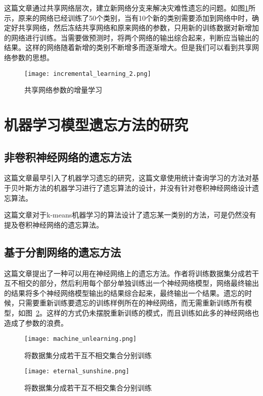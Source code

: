这篇文章\cite{Sarwar_2020}通过共享网络层次，建立新网络分支来解决灾难性遗忘的问题。如图\ref{fig:incremental_learning_2}所示，原来的网络已经训练了50个类别，当有10个新的类别需要添加到网络中时，确定好共享网络，然后冻结共享网络和原来网络的参数，只用新的训练数据对新增加的网络进行训练。当需要做预测时，将两个网络的输出综合起来，判断应当输出的结果。这样的网络随着新增的类别不断增多而逐渐增大。但是我们可以看到共享网络参数的思想。
\begin{figure}
    \centering
    \texttt{[image: incremental\_learning\_2.png]}
    \caption{共享网络参数的增量学习}
    \label{fig:incremental_learning_2}
\end{figure}

\section{机器学习模型遗忘方法的研究}
\subsection{非卷积神经网络的遗忘方法}
这篇文章\cite{yinzhicao2015}最早引入了机器学习遗忘的研究，这篇文章使用统计查询学习的方法对基于贝叶斯方法的机器学习进行了遗忘算法的设计，并没有针对卷积神经网络设计遗忘算法。

这篇文章\cite{antonio2019}对于k-means机器学习的算法设计了遗忘某一类别的方法，可是仍然没有提及卷积神经网络的遗忘算法。

\subsection{基于分割网络的遗忘方法}
这篇文章\cite{2019arXiv191203817B}提出了一种可以用在神经网络上的遗忘方法。作者将训练数据集分成若干互不相交的部分，然后利用每个部分单独训练出一个神经网络模型，网络最终输出的结果将多个神经网络模型输出的结果综合起来，最终输出一个结果。遗忘的时候，只需要重新训练要遗忘的训练样例所在的神经网络，而无需重新训练所有模型，如图~\ref{fig:machine_unlearning}。这样的方式仍未摆脱重新训练的模式，而且训练如此多的神经网络也造成了参数的浪费。
\begin{figure}
    \centering
    \texttt{[image: machine\_unlearning.png]}
    \caption{将数据集分成若干互不相交集合分别训练}
    \label{fig:machine_unlearning}
\end{figure}
\begin{figure}
    \centering
    \texttt{[image: eternal\_sunshine.png]}
    \caption{将数据集分成若干互不相交集合分别训练}
    \label{fig:eternal_sunshine}
\end{figure}
